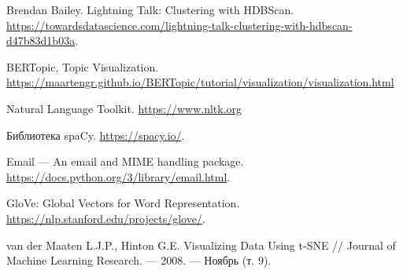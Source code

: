 \begin{thebibliography}{3}
Brendan Bailey. Lightning Talk: Clustering with HDBScan. \url{https://towardsdatascience.com/lightning-talk-clustering-with-hdbscan-d47b83d1b03a}.

BERTopic, Topic Visualization. \url{https://maartengr.github.io/BERTopic/tutorial/visualization/visualization.html}

Natural Language Toolkit.
\url{https://www.nltk.org}

Библиотека spaCy. \url{https://spacy.io/}.

Email — An email and MIME handling package. \url{https://docs.python.org/3/library/email.html}.


GloVe: Global Vectors for Word Representation. \url{https://nlp.stanford.edu/projects/glove/}.

van der Maaten L.J.P., Hinton G.E. Visualizing Data Using t-SNE // Journal of Machine Learning Research. — 2008. — Ноябрь (т. 9).



\end{thebibliography}


